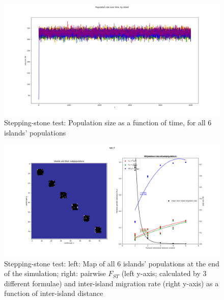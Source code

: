 ﻿\documentclass{article}
\begin{document}
\begin{figure}[h!]
\includegraphics[width=175mm]{./img/validation/stepping_stone/pop_size_over_time.png}
\caption{Stepping-stone test: Population size as a function of time, for all 6 islands' populations}
\end{figure}


\begin{figure}[h!]
\includegraphics[width=175mm]{./img/validation/stepping_stone/pop_plot_and_Fst_and_mig_rate_plot.png}
        \caption{Stepping-stone test: left: Map of all 6 islands' populations at the end of the simulation; right: pairwise $F_{ST}$ (left y-axis; calculated by 3 different formulae) and inter-island migration rate (right y-axis) as a function of inter-island distance}
\end{figure}
\end{document}
